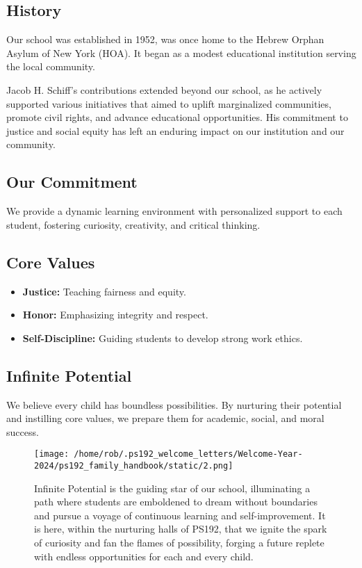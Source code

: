 \documentclass[11pt]{article}
\begin{document}
\subsection{History}
\label{sec:orgfe1c335}
Our school was established in 1952, was once home to the Hebrew Orphan Asylum of New York (HOA). It began as a modest educational institution serving the local community.

Jacob H. Schiff’s contributions extended beyond our school, as he actively supported various initiatives that aimed to uplift marginalized communities, promote civil rights, and advance educational opportunities. His commitment to justice and social equity has left an enduring impact on our institution and our community.

\subsection{Our Commitment}
\label{sec:org3a3ab6a}
We provide a dynamic learning environment with personalized support to each student, fostering curiosity, creativity, and critical thinking.

\subsection{Core Values}
\label{sec:org9e4f87e}
\begin{itemize}
\item \textbf{\textbf{Justice:}} Teaching fairness and equity.
\item \textbf{\textbf{Honor:}} Emphasizing integrity and respect.
\item \textbf{\textbf{Self-Discipline:}} Guiding students to develop strong work ethics.
\end{itemize}

\subsection{Infinite Potential}
\label{sec:orgcb21d97}
We believe every child has boundless possibilities. By nurturing their potential and instilling core values, we prepare them for academic, social, and moral success.

\begin{figure}[h]
    \centering
    \texttt{[image: /home/rob/.ps192\_welcome\_letters/Welcome-Year-2024/ps192\_family\_handbook/static/2.png]}
    \caption{Infinite Potential is the guiding star of our school, illuminating a path where students are emboldened to dream without boundaries and pursue a voyage of continuous learning and self-improvement. It is here, within the nurturing halls of PS192, that we ignite the spark of curiosity and fan the flames of possibility, forging a future replete with endless opportunities for each and every child.}
\end{figure}
\end{document}
